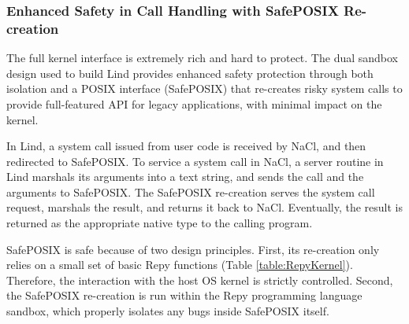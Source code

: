 {\subsubsection{Enhanced Safety in Call Handling with SafePOSIX Re-creation}

The full kernel interface is extremely rich and hard to protect.
The dual sandbox \lip design used to build Lind provides enhanced
safety protection through both isolation and a POSIX interface (SafePOSIX) that
re-creates risky system calls to
provide full-featured API for legacy applications, with minimal impact on the kernel.

In Lind, a system call issued from user code is
received by NaCl, and then redirected to SafePOSIX.
To service a system call in NaCl, a server routine in
Lind marshals its arguments into a text string, and sends the call and the arguments
to SafePOSIX. The SafePOSIX re-creation serves the system call request, marshals the result, and
returns it back to NaCl. Eventually, the result is returned as the appropriate
native type to the calling program.

SafePOSIX is safe because of two design principles.
First, its re-creation only relies on a small set of basic Repy functions (Table \ref{table:RepyKernel}).
Therefore, the interaction with the host OS kernel is strictly controlled.
Second, the SafePOSIX re-creation is run within the Repy programming language sandbox,
which properly isolates any bugs inside SafePOSIX itself.



}
